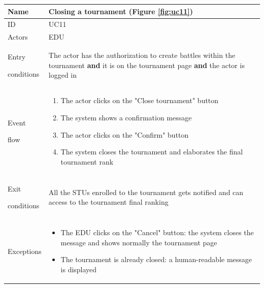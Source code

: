\begin{center}
    \def\arraystretch{1.5}
    \begin{tabular}{| m{2cm} | m{10cm}|}
        \hline
        Name                  & Closing a tournament (Figure \ref{fig:uc11})                                                                                                                                 \\ \hline
        ID                    & UC11                                                                                                                                                  \\ \hline
        Actors                & EDU                                                                                                                                                   \\ \hline
        Entry \par conditions & The actor has the authorization to create battles within the tournament \textbf{and} it is on the tournament page \textbf{and} the actor is logged in \\ \hline
        Event \par flow       & \begin{enumerate}
                                    \item The actor clicks on the "Close tournament" button
                                    \item The system shows a confirmation message
                                    \item The actor clicks on the "Confirm" button
                                    \item The system closes the tournament and elaborates the final tournament rank
                                \end{enumerate}                                                                        \\ \hline
        Exit \par conditions  & All the STUs enrolled to the tournament gets notified and can access to the tournament final ranking                                                  \\ \hline
        Exceptions            & \begin{itemize}
                                    \item The EDU clicks on the "Cancel" button: the system closes the message and shows normally the tournament page     
                                    \item The tournament is already closed: a human-readable message is displayed
                                \end{itemize}                                        \\ \hline
    \end{tabular}
\end{center}

